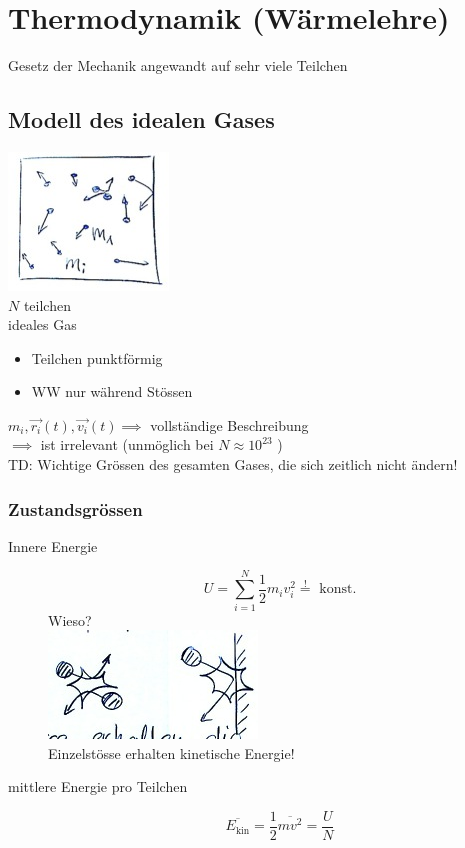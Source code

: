 \chapter{Thermodynamik (Wärmelehre)}
Gesetz der Mechanik angewandt auf sehr viele Teilchen

\section{Modell des idealen Gases}
\includegraphics{Bild108} \\
$N$ teilchen \\
ideales Gas
\begin{itemize}
	\item Teilchen punktförmig
	\item WW nur während Stössen
\end{itemize}
$m_i , \vec{r_i}(t) , \vec{v_i}(t) \implies$ vollständige Beschreibung \\
$\implies$ ist irrelevant (unmöglich bei $N \approx 10^{23}$ ) \\
TD: Wichtige Grössen des gesamten Gases, die sich zeitlich nicht ändern!

\subsection{Zustandsgrössen}
\begin{description}
	\item[Innere Energie]
		\[ U = \sum_{i = 1}^N \frac{1}{2} m_i v_i^2 \overset{!}{=} \text{ konst.} \]
		Wieso? \\
		\includegraphics{Bild109} \\
		Einzelstösse erhalten kinetische Energie!
	\item[mittlere Energie pro Teilchen]
		\[ \overline{E_{\text{kin}}} = \frac{1}{2} \overline{mv^2} = \frac{U}{N} \]
\end{description}

